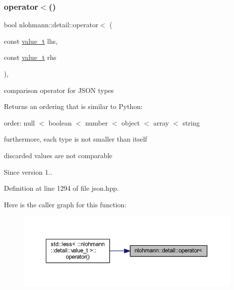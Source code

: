 \subsubsection{\texorpdfstring{operator$<$()}{operator<()}}
{\footnotesize\ttfamily bool nlohmann\+::detail\+::operator$<$ (\begin{DoxyParamCaption}\item[{const \mbox{\hyperlink{namespacenlohmann_1_1detail_a1ed8fc6239da25abcaf681d30ace4985}{value\+\_\+t}}}]{lhs,  }\item[{const \mbox{\hyperlink{namespacenlohmann_1_1detail_a1ed8fc6239da25abcaf681d30ace4985}{value\+\_\+t}}}]{rhs }\end{DoxyParamCaption})\hspace{0.3cm}{\ttfamily [inline]}, {\ttfamily [noexcept]}}



comparison operator for J\+S\+ON types 

Returns an ordering that is similar to Python\+:
\begin{DoxyItemize}
\item order\+: null $<$ boolean $<$ number $<$ object $<$ array $<$ string
\item furthermore, each type is not smaller than itself
\item discarded values are not comparable
\end{DoxyItemize}

\begin{DoxySince}{Since}
version 1.. 
\end{DoxySince}


Definition at line 1294 of file json.\+hpp.

Here is the caller graph for this function\+:
\nopagebreak
\begin{figure}[H]
\begin{center}
\leavevmode
\includegraphics[width=350pt]{namespacenlohmann_1_1detail_a09169efff3bd1771fff29bd92cea19e0_icgraph}
\end{center}
\end{figure}
\mbox{\label{namespacenlohmann_1_1detail_a18759c536d89c4dd3a118bd3ecb790da}} 
